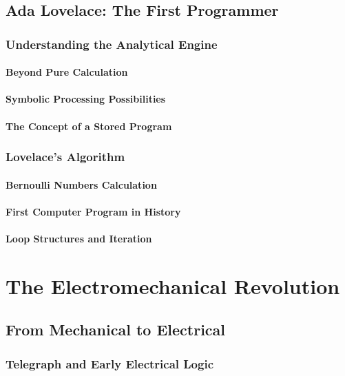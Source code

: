 \documentclass[12pt, oneside]{book}
\begin{document}
\section{Ada Lovelace: The First Programmer}
\subsection{Understanding the Analytical Engine}
\subsubsection{Beyond Pure Calculation}
\subsubsection{Symbolic Processing Possibilities}
\subsubsection{The Concept of a Stored Program}

\subsection{Lovelace's Algorithm}
\subsubsection{Bernoulli Numbers Calculation}
\subsubsection{First Computer Program in History}
\subsubsection{Loop Structures and Iteration}


\chapter{The Electromechanical Revolution}

\section{From Mechanical to Electrical}
\subsection{Telegraph and Early Electrical Logic}
\end{document}
